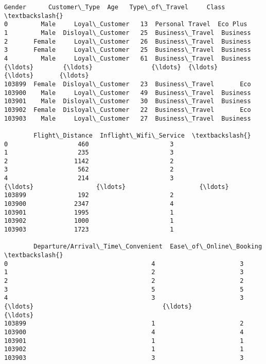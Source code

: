 \documentclass[11pt]{article}
\makeatletter
\newcommand{\boxspacing}{\kern\kvtcb@left@rule\kern\kvtcb@boxsep}
\newcommand{\prompt}[4]{
        {\ttfamily\llap{{\color{#2}[#3]:\hspace{3pt}#4}}\vspace{-\baselineskip}}
    }
\makeatother
\begin{document}
            \begin{tcolorbox}[breakable, size=fbox, boxrule=.5pt, pad at break*=1mm, opacityfill=0]
\prompt{Out}{outcolor}{14}{\boxspacing}
\begin{Verbatim}[commandchars=\\\{\}]
        Gender      Customer\_Type  Age   Type\_of\_Travel     Class  \textbackslash{}
0         Male     Loyal\_Customer   13  Personal Travel  Eco Plus
1         Male  Disloyal\_Customer   25  Business\_Travel  Business
2       Female     Loyal\_Customer   26  Business\_Travel  Business
3       Female     Loyal\_Customer   25  Business\_Travel  Business
4         Male     Loyal\_Customer   61  Business\_Travel  Business
{\ldots}        {\ldots}                {\ldots}  {\ldots}              {\ldots}       {\ldots}
103899  Female  Disloyal\_Customer   23  Business\_Travel       Eco
103900    Male     Loyal\_Customer   49  Business\_Travel  Business
103901    Male  Disloyal\_Customer   30  Business\_Travel  Business
103902  Female  Disloyal\_Customer   22  Business\_Travel       Eco
103903    Male     Loyal\_Customer   27  Business\_Travel  Business

        Flight\_Distance  Inflight\_Wifi\_Service  \textbackslash{}
0                   460                      3
1                   235                      3
2                  1142                      2
3                   562                      2
4                   214                      3
{\ldots}                 {\ldots}                    {\ldots}
103899              192                      2
103900             2347                      4
103901             1995                      1
103902             1000                      1
103903             1723                      1

        Departure/Arrival\_Time\_Convenient  Ease\_of\_Online\_Booking  \textbackslash{}
0                                       4                       3
1                                       2                       3
2                                       2                       2
3                                       5                       5
4                                       3                       3
{\ldots}                                   {\ldots}                     {\ldots}
103899                                  1                       2
103900                                  4                       4
103901                                  1                       1
103902                                  1                       1
103903                                  3                       3


\end{Verbatim}
\end{tcolorbox}
\end{document}

